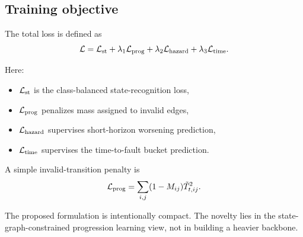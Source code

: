 \subsection{Training objective}

The total loss is defined as
\begin{equation}
\mathcal{L} = \mathcal{L}_{\mathrm{st}} + \lambda_1 \mathcal{L}_{\mathrm{prog}} + \lambda_2 \mathcal{L}_{\mathrm{hazard}} + \lambda_3 \mathcal{L}_{\mathrm{time}}.
\end{equation}

Here:
\begin{itemize}
\item $\mathcal{L}_{\mathrm{st}}$ is the class-balanced state-recognition loss,
\item $\mathcal{L}_{\mathrm{prog}}$ penalizes mass assigned to invalid edges,
\item $\mathcal{L}_{\mathrm{hazard}}$ supervises short-horizon worsening prediction,
\item $\mathcal{L}_{\mathrm{time}}$ supervises the time-to-fault bucket prediction.
\end{itemize}

A simple invalid-transition penalty is
\begin{equation}
\mathcal{L}_{\mathrm{prog}} = \sum_{i,j} (1-M_{ij}) \tilde{T}_{t,ij}^{2}.
\end{equation}

The proposed formulation is intentionally compact. The novelty lies in the state-graph-constrained progression learning view, not in building a heavier backbone.
